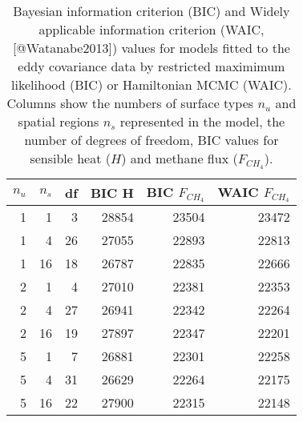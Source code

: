 \begin{table}[ht]
\centering
\begin{tabular}{rrrrrr}
  \hline
$n_u$ & $n_s$ & df & BIC H & BIC $F_{CH_4}$ & WAIC $F_{CH_4}$ \\ 
  \hline
1 & 1 & 3 & 28854 & 23504 & 23472 \\ 
  1 & 4 & 26 & 27055 & 22893 & 22813 \\ 
  1 & 16 & 18 & 26787 & 22835 & 22666 \\ 
  2 & 1 & 4 & 27010 & 22381 & 22353 \\ 
  2 & 4 & 27 & 26941 & 22342 & 22264 \\ 
  2 & 16 & 19 & 27897 & 22347 & 22201 \\ 
  5 & 1 & 7 & 26881 & 22301 & 22258 \\ 
  5 & 4 & 31 & 26629 & 22264 & 22175 \\ 
  5 & 16 & 22 & 27900 & 22315 & 22148 \\ 
   \hline
\end{tabular}
\caption{Bayesian information criterion (BIC) and Widely applicable information criterion (WAIC, [@Watanabe2013]) values for models fitted to the eddy covariance data by restricted maximimum likelihood (BIC) or Hamiltonian MCMC (WAIC).  Columns show the numbers of surface types $n_u$ and spatial regions $n_s$ represented in the model, the number of degrees of freedom, BIC values for sensible heat ($H$) and methane flux ($F_{CH_4}$).} 
\label{tab:bic_output}

\end{table}